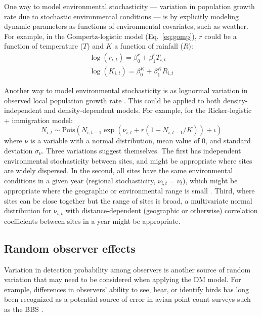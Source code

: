 \documentclass[12pt]{article}
\begin{document}
One way to model environmental stochasticity --- variation in population growth
rate due to stochastic environmental conditions --- is by explicitly
modeling dynamic parameters as functions of environmental covariates, such
as weather.  For example, in the Gompertz-logistic model (Eq.~\ref{eq:gomp}), $r$ could be a 
function of temperature ($T$) and $K$ a function of rainfall ($R$):
\begin{gather}
\log(r_{i,t}) = \beta^{r}_{0} + \beta^{r}_{1}T_{i,t} \nonumber \\
\log(K_{i,t}) = \beta^{K}_{0} + \beta^{K}_{1}R_{i,t}  
\label{eq:weather}
\end{gather}

Another way to model environmental stochasticity is as lognormal variation in observed local population 
growth rate \citep{bjornstad:2001,bonsall_hastings:2004}.  This could be applied to both density-independent and density-dependent models.
For example, for the Ricker-logistic + immigration model:
\begin{equation}
N_{i,t} \sim
\mathrm{Pois}(N_{i,t-1}\exp(\nu_{i,t} + r(1-N_{i,t-1}/K)) + \iota)
\label{eq:nuRand}
\end{equation}
where $\nu$ is a variable with a normal distribution, mean value of 0, and standard deviation $\sigma_\nu$.  
Three variations suggest themselves.  The first has independent environmental stochasticity 
between sites, and might be appropriate where sites are widely dispersed.  In the second, 
all sites have the same environmental conditions in a given year (regional stochasticity, $\nu_{i,t} = \nu_{t}$),
which might be appropriate where the geographic or environmental range is small \citep{hanski:1998}.  
Third, where sites can be close together but the range of sites is broad, a multivariate normal distribution 
for $\nu_{i,t}$ with distance-dependent (geographic or otherwise) correlation coefficients
between sites in a year might be appropriate.

\subsection{Random observer effects}

Variation in detection probability among observers is another
source of random variation that may need to be considered when applying
the DM model. For example, differences in observers' ability to see,
hear, or identify birds has long been recognized as a potential source of error
in avian point count surveys such as the BBS 
\citep{robbins_etal:1986,sauer_etal:1994auk,campbell_francis:2011}.%
\end{document}
